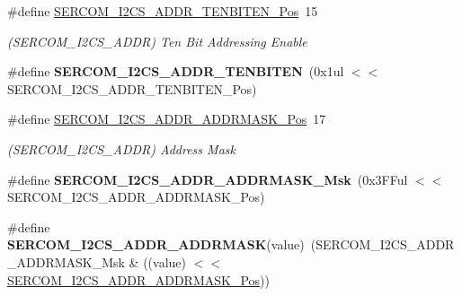 \begin{DoxyCompactItemize}
\item 
\hypertarget{group___s_a_m_l21___s_e_r_c_o_m_ga7e56075520cc6e041fa5eeb0c1f79a3e}{}\#define \hyperlink{group___s_a_m_l21___s_e_r_c_o_m_ga7e56075520cc6e041fa5eeb0c1f79a3e}{S\+E\+R\+C\+O\+M\+\_\+\+I2\+C\+S\+\_\+\+A\+D\+D\+R\+\_\+\+T\+E\+N\+B\+I\+T\+E\+N\+\_\+\+Pos}~15\label{group___s_a_m_l21___s_e_r_c_o_m_ga7e56075520cc6e041fa5eeb0c1f79a3e}

\begin{DoxyCompactList}\small\item\em (S\+E\+R\+C\+O\+M\+\_\+\+I2\+C\+S\+\_\+\+A\+D\+D\+R) Ten Bit Addressing Enable \end{DoxyCompactList}\item 
\hypertarget{group___s_a_m_l21___s_e_r_c_o_m_gad183c5e9f9e478733014304b935adcac}{}\#define {\bfseries S\+E\+R\+C\+O\+M\+\_\+\+I2\+C\+S\+\_\+\+A\+D\+D\+R\+\_\+\+T\+E\+N\+B\+I\+T\+E\+N}~(0x1ul $<$$<$ S\+E\+R\+C\+O\+M\+\_\+\+I2\+C\+S\+\_\+\+A\+D\+D\+R\+\_\+\+T\+E\+N\+B\+I\+T\+E\+N\+\_\+\+Pos)\label{group___s_a_m_l21___s_e_r_c_o_m_gad183c5e9f9e478733014304b935adcac}

\item 
\hypertarget{group___s_a_m_l21___s_e_r_c_o_m_ga1b9e43481fc2d9d6a4aabb6cc6c0c2a6}{}\#define \hyperlink{group___s_a_m_l21___s_e_r_c_o_m_ga1b9e43481fc2d9d6a4aabb6cc6c0c2a6}{S\+E\+R\+C\+O\+M\+\_\+\+I2\+C\+S\+\_\+\+A\+D\+D\+R\+\_\+\+A\+D\+D\+R\+M\+A\+S\+K\+\_\+\+Pos}~17\label{group___s_a_m_l21___s_e_r_c_o_m_ga1b9e43481fc2d9d6a4aabb6cc6c0c2a6}

\begin{DoxyCompactList}\small\item\em (S\+E\+R\+C\+O\+M\+\_\+\+I2\+C\+S\+\_\+\+A\+D\+D\+R) Address Mask \end{DoxyCompactList}\item 
\hypertarget{group___s_a_m_l21___s_e_r_c_o_m_ga18e4c78a2018133aab675c0b598ce756}{}\#define {\bfseries S\+E\+R\+C\+O\+M\+\_\+\+I2\+C\+S\+\_\+\+A\+D\+D\+R\+\_\+\+A\+D\+D\+R\+M\+A\+S\+K\+\_\+\+Msk}~(0x3\+F\+Ful $<$$<$ S\+E\+R\+C\+O\+M\+\_\+\+I2\+C\+S\+\_\+\+A\+D\+D\+R\+\_\+\+A\+D\+D\+R\+M\+A\+S\+K\+\_\+\+Pos)\label{group___s_a_m_l21___s_e_r_c_o_m_ga18e4c78a2018133aab675c0b598ce756}

\item 
\hypertarget{group___s_a_m_l21___s_e_r_c_o_m_gafffd3e21fdb350fbdffeb95979721bcf}{}\#define {\bfseries S\+E\+R\+C\+O\+M\+\_\+\+I2\+C\+S\+\_\+\+A\+D\+D\+R\+\_\+\+A\+D\+D\+R\+M\+A\+S\+K}(value)~(S\+E\+R\+C\+O\+M\+\_\+\+I2\+C\+S\+\_\+\+A\+D\+D\+R\+\_\+\+A\+D\+D\+R\+M\+A\+S\+K\+\_\+\+Msk \& ((value) $<$$<$ \hyperlink{group___s_a_m_l21___s_e_r_c_o_m_ga1b9e43481fc2d9d6a4aabb6cc6c0c2a6}{S\+E\+R\+C\+O\+M\+\_\+\+I2\+C\+S\+\_\+\+A\+D\+D\+R\+\_\+\+A\+D\+D\+R\+M\+A\+S\+K\+\_\+\+Pos}))\label{group___s_a_m_l21___s_e_r_c_o_m_gafffd3e21fdb350fbdffeb95979721bcf}


\end{DoxyCompactItemize}
